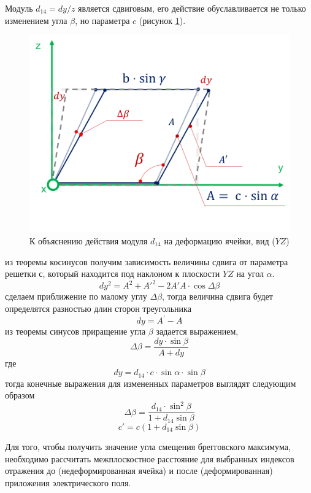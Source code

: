 Модуль $d_{14} = dy/z$ является сдвиговым, его действие обуславливается не только
изменением угла $\beta$, но параметра $c$ (рисунок \ref{ris:d14}).
\begin{figure}[H]
  \centering
  \includegraphics[width=.6\textwidth]{images/d14.png}
  \caption{К объяснению действия модуля $d_{14}$ на деформацию ячейки, вид ($YZ$)}
  \label{ris:d14}
\end{figure}
из теоремы косинусов получим зависимость величины сдвига от параметра решетки $с$,
который находится под наклоном к плоскости $YZ$ на угол $\alpha$.
$$
    dy^2 = A^2 + A{'}^2 - 2 A{'}A \cdot \cos \Delta \beta
$$
сделаем приближение по малому углу $\Delta \beta$, тогда величина сдвига будет
определятся разностью длин сторон треугольника
$$
  dy = A^{'} - A
$$
из теоремы синусов приращение угла $\beta$ задается выражением,
$$
\Delta \beta = \frac{dy \cdot\sin \beta}{ A+dy }
$$
где
$$
dy = d_{14} \cdot c \cdot \sin \alpha \cdot \sin \beta
$$
тогда конечные выражения для измененных параметров выглядят следующим образом
\begin{equation}
   \Delta \beta = \frac{d_{14} \cdot \sin^2\beta}{1+d_{14}\sin \beta}
   \label{eq:b_formed_5}
\end{equation}
\begin{equation}
   c{'} = c(1+d_{14}\sin\beta)
   \label{eq:b_formed_6}
\end{equation}

Для того, чтобы получить значение угла смещения брегговского максимума,
необходимо рассчитать межплоскостное расстояние для выбранных индексов отражения
до (недеформированная ячейка) и после (деформированная) приложения электрического
поля.
